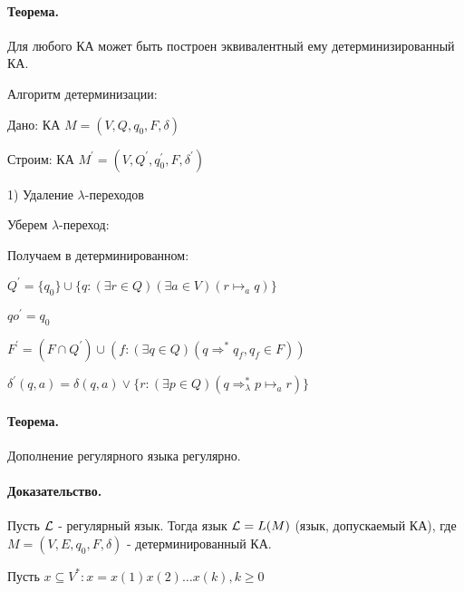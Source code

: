\documentclass{report}
\newcommand{\pathto}[1][1]{ \Rightarrow^{*}_{#1} }
\begin{document}
\paragraph*{Теорема.}
Для любого КА может быть построен эквивалентный ему детерминизированный КА.

Алгоритм детерминизации:

Дано: КА $M = (V, Q, q_0,F,\delta)$

Строим: КА $M^{\prime} = (V, Q^{\prime},q_0^{\prime},F,\delta^{\prime})$

1) Удаление $\lambda$-переходов

Уберем $\lambda$-переход:

Получаем в детерминированном:

\medskip

$Q^{\prime} = \{q_0\} \cup \{q: (\exists r \in Q)(\exists a \in V)(r \mapsto_{a} q)\} $

$qo^{\prime} = q_0$ 

$F^{\prime} = (F \cap Q^{\prime}) \cup (f: (\exists q \in Q)(q \pathto[] q_{f}, q_{f} \in F))$

$\delta^{\prime}(q,a) = \delta(q,a) \lor \{r: (\exists p \in Q)(q \pathto[\lambda] p \mapsto_{a} r)\} $
\paragraph*{Теорема.}
Дополнение регулярного языка регулярно.
\paragraph*{Доказательство.}
Пусть $ {\cal L}$ - регулярный язык. Тогда язык $ {\cal L} = L(M)$ (язык, допускаемый КА), где
$M = (V, E, q_0,F,\delta)$ - детерминированный КА.

Пусть $x \subseteq V^{*}: x = x(1)x(2)\ldots x(k), k \ge 0$ 

\end{document}
